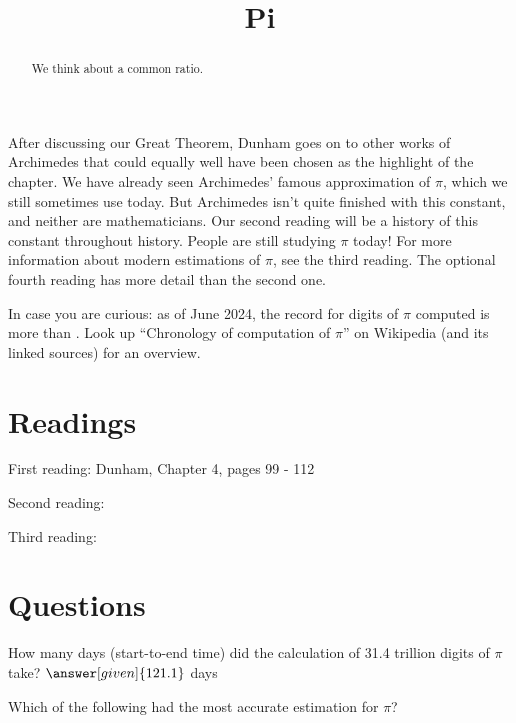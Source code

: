 \documentclass{ximera}
\title{Pi}
\begin{document}
\begin{abstract}
  We think about a common ratio.    
\end{abstract}
\maketitle

After discussing our Great Theorem, Dunham goes on to other works of Archimedes that could equally well have been chosen as the highlight of the chapter.   We have already seen Archimedes' famous approximation of $\pi$, which we still sometimes use today. But Archimedes isn't quite finished with this constant, and neither are mathematicians.  Our second reading will be a history of this constant throughout history.  People are still studying $\pi$ today!  For more information about modern estimations of $\pi$, see the third reading.  The optional fourth reading has more detail than the second one.

In case you are curious: as of June 2024, the record for digits of $\pi$ computed is more than .  Look up ``Chronology of computation of $\pi$'' on Wikipedia (and its linked sources) for an overview.


\section{Readings}
First reading: Dunham, Chapter 4, pages 99 - 112

Second reading: 

Third reading: 


\section{Questions}

\begin{question}
How many days (start-to-end time) did the calculation of 31.4 trillion digits of $\pi$ take? $\answer[given]{121.1}$ days
\end{question}

\begin{question}
Which of the following had the most accurate estimation for $\pi$?
\begin{multipleChoice}
\end{multipleChoice}
\end{question}
\end{document}
